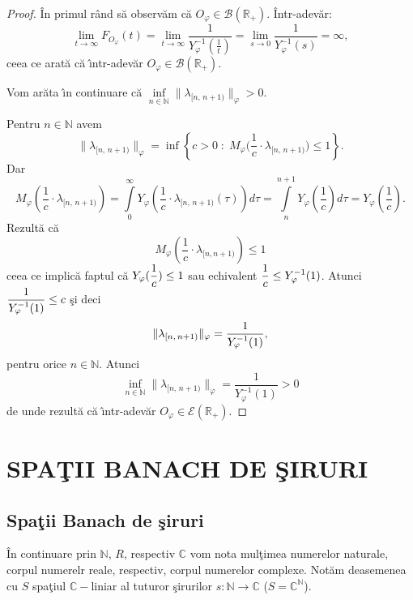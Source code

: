 \documentclass[ a4paper, 12pt]{report}
\theoremstyle{definition}
\theoremstyle{remark}
\numberwithin{equation}{section}
\begin{document}
\begin{proof} \^ In primul r\^ and s\u a observ\u am c\u a $O_\varphi \in \mathcal{B}(\mathbb{R}_+)$. \^ Intr-adev\u ar:
$$\lim\limits_{t \rightarrow \infty}F_{O_\varphi}(t) = \lim\limits_{t \rightarrow \infty} \frac{1}{Y_\varphi^{-1}(\frac{1}{t})} =
\lim\limits_{s \rightarrow 0}  \frac{1}{Y_\varphi^{-1}(s)} = \infty,$$ ceea ce arat\u a c\u a \^\i ntr-adev\u ar $O_\varphi \in \mathcal{B}(\mathbb{R}_+).$

\smallskip

Vom ar\u ata \^\i n continuare c\u a $\inf\limits_{n \in \mathbb{N}} \lVert \lambda_{[n,\, n+1)} \rVert_\varphi > 0$.

Pentru $n \in \mathbb{N}$ avem
$$ \lVert \lambda_{[n,\, n+1)}\rVert_\varphi = \inf\left\{ c>0 \; : \; M_\varphi\Big( \frac{1}{c} \cdot \lambda_{[n,\, n+1)}\Big) \leq 1\right\}.$$ Dar
$$M_\varphi(\frac{1}{c} \cdot \lambda_{[n,\, n+1)}) = \int\limits_{0}^{\infty}Y_\varphi\left( \frac{1}{c}\cdot \lambda_{[n,\, n+1)}(\tau)\right)d\tau = \int\limits_{n}^{n+1}Y_\varphi(\frac{1}{c}) d\tau = Y_\varphi(\frac{1}{c}).$$ Rezult\u a c\u a
$$M_\varphi(\frac{1}{c}\cdot \lambda_{[n,n+1)})\leq 1 $$ ceea ce implic\u a faptul c\u a $Y_\varphi(\displaystyle\frac{1}{c}) \leq 1$ sau echivalent $\displaystyle\frac{1}{c} \leq Y_\varphi^{-1}(1)$. Atunci $\displaystyle\frac{1}{Y_\varphi^{-1}(1)} \leq c$ \c si deci
$$\lVert \lambda_{[n,\, n+1)} \rVert_\varphi = \displaystyle\frac{1}{Y_\varphi^{-1}(1)},$$ pentru orice $n \in \mathbb{N}$. Atunci
$$ \inf\limits_{n \in \mathbb{N}}\lVert \lambda_{[n,\, n+1)}\rVert_\varphi = \frac{1}{Y_\varphi^{-1}(1)} > 0$$ de unde rezult\u a  c\u a \^\i ntr-adev\u ar $O_\varphi \in \mathcal{E}(\mathbb{R}_+)$.
\end{proof}




\chapter{SPA\c TII BANACH DE \c SIRURI}
\section{Spa\c tii Banach de \c siruri}

\^ In continuare prin $\mathbb{N}$, $R$, respectiv $\mathbb{C}$ vom nota mul\c timea numerelor naturale, corpul numerelr reale, respectiv, corpul numerelor complexe. Not\u am deasemenea cu $S$ spa\c tiul $\mathbb{C}-$liniar al tuturor \c sirurilor $s:\mathbb{N} \rightarrow \mathbb{C}$ ($S = {\mathbb{C}}^{\mathbb{N}}$).
\end{document}
